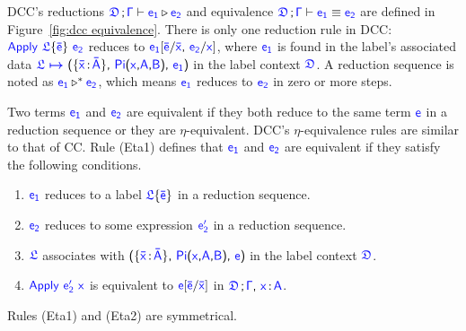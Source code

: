DCC's reductions $\targetcon \vdash \target{e_1} \triangleright \target{e_2}$ and equivalence $\targetcon \vdash \target{e_1} \equiv \target{e_2}$ are defined in Figure~\ref{fig:dcc equivalence}. 
There is only one reduction rule in DCC: $\target{Apply\ } \targetlab{\flabel}{\bar{e}}\ \target{e_2}$
reduces to $\target{e_1}[\target{\bar{e}} \slash \target{\bar{x}} \sfcomma \target{e_2} \slash \target{x}]$, where $\target{e_1}$ is found in the label's associated data $\itemdef{\target{\flabel}}{\itemtype{\bar{x}}{\bar{A}}}{\targetpi{x}{A}{B}}{\target{e_1}}$ in the label context $\target{\fdef}$. A reduction sequence is noted as $\target{e_1} \triangleright^* \target{e_2}$, which means $\target{e_1}$ reduces to $\target{e_2}$ in zero or more steps.

Two terms $\target{e_1}$ and $\target{e_2}$ are equivalent if they both reduce to the same term $\target{e}$ in a reduction sequence or they are $\eta$-equivalent. DCC's $\eta$-equivalence rules are similar to that of CC. 
Rule (Eta1) defines that $\target{e_1}$ and $\target{e_2}$ are equivalent if they satisfy the following conditions.
\begin{enumerate}
	\item  $\target{e_1}$ reduces to a label $\targetlab{\flabel}{\bar{e}}$ in a reduction sequence.
	\item  $\target{e_2}$ reduces to some expression $\target{e_2'}$ in a reduction sequence.
	\item  $\target{\flabel}$ associates with 
	$\textsf{(}\{\itemtype{\bar{x}}{\bar{A}}\}\textsf{,}\ \targetpi{x}{A}{B} \textsf{,}\ \target{e} \textsf{)}$ 
	in the label context $\target{\fdef}$.
	\item  $\targetapp{e_2'}{x}$ is equivalent to $\target{e}\targetsub{\bar{e}}{\bar{x}}$ in $\targetcon\sfcomma\itemtype{x}{A}$.
\end{enumerate}
Rules (Eta1) and (Eta2) are symmetrical.







